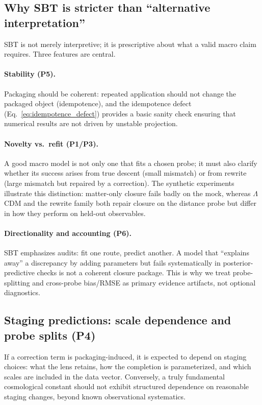 \documentclass[11pt]{article}
\theoremstyle{definition}
\theoremstyle{plain}
\theoremstyle{remark}
\begin{document}
\subsection{Why SBT is stricter than ``alternative interpretation''}\label{sec:discussion:stricter}
SBT is not merely interpretive; it is prescriptive about what a valid macro claim requires.
Three features are central.

\paragraph{Stability (P5).}
Packaging should be coherent: repeated application should not change the packaged object (idempotence), and the idempotence defect (Eq.~\eqref{eq:idempotence_defect}) provides a basic sanity check ensuring that numerical results are not driven by unstable projection.

\paragraph{Novelty vs.\ refit (P1/P3).}
A good macro model is not only one that fits a chosen probe; it must also clarify whether its success arises from true descent (small mismatch) or from rewrite (large mismatch but repaired by a correction).
The synthetic experiments illustrate this distinction: matter-only closure fails badly on the mock, whereas $\Lambda$CDM and the rewrite family both repair closure on the distance probe but differ in how they perform on held-out observables.

\paragraph{Directionality and accounting (P6).}
SBT emphasizes audits: fit one route, predict another.
A model that ``explains away'' a discrepancy by adding parameters but fails systematically in posterior-predictive checks is not a coherent closure package.
This is why we treat probe-splitting and cross-probe bias/RMSE as primary evidence artifacts, not optional diagnostics.

\subsection{Staging predictions: scale dependence and probe splits (P4)}\label{sec:discussion:staging}
If a correction term is packaging-induced, it is expected to depend on staging choices: what the lens retains, how the completion is parameterized, and which scales are included in the data vector. Conversely, a truly fundamental cosmological constant should not exhibit structured dependence on reasonable staging changes, beyond known observational systematics.
\end{document}
